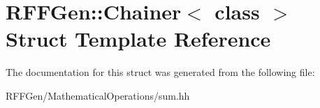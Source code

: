 \hypertarget{structRFFGen_1_1Chainer}{\section{R\-F\-F\-Gen\-:\-:Chainer$<$ class $>$ Struct Template Reference}
\label{structRFFGen_1_1Chainer}
}


The documentation for this struct was generated from the following file\-:\begin{DoxyCompactItemize}
\item 
R\-F\-F\-Gen/\-Mathematical\-Operations/sum.\-hh\end{DoxyCompactItemize}
